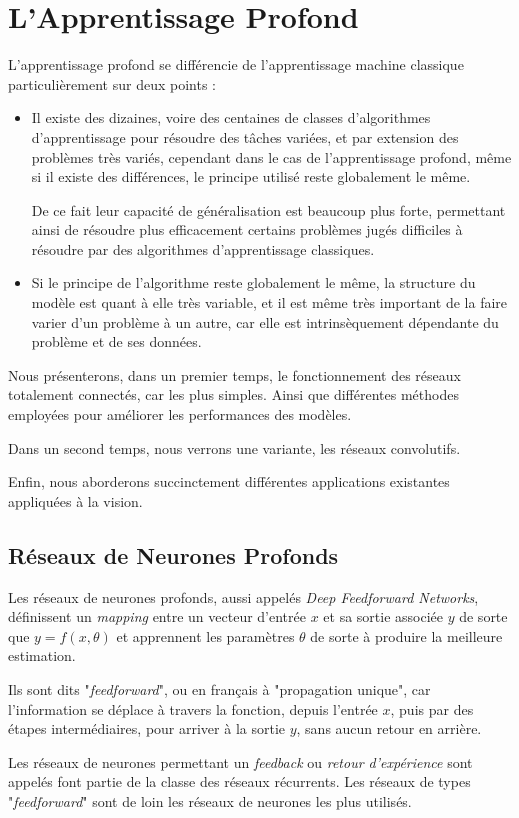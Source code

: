 \documentclass[a4paper, 11pt]{report}
\begin{document}
\chapter{L'Apprentissage Profond}
L'apprentissage profond se différencie de l'apprentissage machine classique particulièrement sur deux points :
\begin{itemize}
	\item Il existe des dizaines, voire des centaines de classes d'algorithmes d'apprentissage pour résoudre des tâches variées, et par extension des problèmes très variés, cependant dans le cas de l'apprentissage profond, même si il existe des différences, le principe utilisé reste globalement le même.
	
	De ce fait leur capacité de généralisation est beaucoup plus forte, permettant ainsi de résoudre plus efficacement certains problèmes jugés difficiles à résoudre par des algorithmes d'apprentissage classiques.
	\item Si le principe de l'algorithme reste globalement le même, la structure du modèle est quant à elle très variable, et il est même très important de la faire varier d'un problème à un autre, car elle est intrinsèquement dépendante du problème et de ses données.
	      \end{itemize}
Nous présenterons, dans un premier temps, le fonctionnement des réseaux totalement connectés, car les plus simples. Ainsi que différentes méthodes employées pour améliorer les performances des modèles.

Dans un second temps, nous verrons une variante, les réseaux convolutifs.

Enfin, nous aborderons succinctement différentes applications existantes appliquées à la vision.
\section{Réseaux de Neurones Profonds}
Les réseaux de neurones profonds, aussi appelés \emph{Deep Feedforward Networks}, définissent un \emph{mapping} entre un vecteur d'entrée $x$ et sa sortie associée $y$ de sorte que $y = f(x,\theta)$ et apprennent les paramètres $\theta$ de sorte à produire la meilleure estimation.

Ils sont dits "\emph{feedforward}", ou en français à "propagation unique", car l'information se déplace à travers la fonction, depuis l'entrée $x$, puis par des étapes intermédiaires, pour arriver à la sortie $y$, sans aucun retour en arrière.

Les réseaux de neurones permettant un \emph{feedback} ou \emph{retour d'expérience} sont appelés font partie de la classe des réseaux récurrents.
Les réseaux de types "\emph{feedforward}" sont de loin les réseaux de neurones les plus utilisés.
\end{document}
